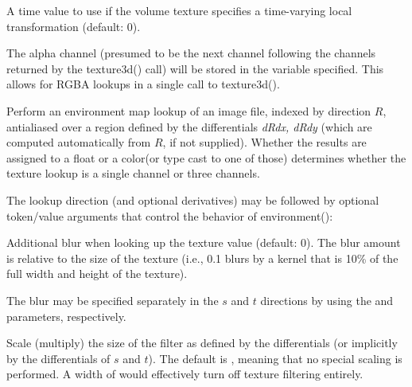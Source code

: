 \documentclass[11pt,letterpaper]{book}
\def\color{{\cf color}\xspace}
\def\float{{\cf float}\xspace}
\begin{document}
\vspace{12pt}
A time value to use if the volume texture specifies a time-varying
local transformation (default: 0).
\apiend
\vspace{-16pt}

\vspace{12pt}
The alpha channel (presumed to be the next channel following the
channels returned by the {\cf texture3d()} call) will be stored in the
variable specified.  This allows for RGBA lookups in a single call to
{\cf texture3d()}.
\apiend
\vspace{-16pt}

\apiend


Perform an environment map lookup of an image file, indexed by direction
$R$, antialiased over a region defined by the differentials
\emph{dRdx, dRdy} (which are computed
automatically from $R$, if not supplied).  Whether the results
are assigned to a \float or a \color (or type cast to one of those)
determines whether the texture lookup is a single channel or three
channels.

The lookup direction (and optional derivatives) may be followed by optional token/value
arguments that control the behavior of {\cf environment()}:

\vspace{12pt}
Additional blur when looking up the texture value (default: 0).  The
blur amount is relative to the size of the texture (i.e., 0.1 blurs by a
kernel that is 10\% of the full width and height of the texture).

The blur may be specified separately in the $s$ and $t$ directions by
using the  and  parameters, respectively.
\apiend
\vspace{-16pt}

\vspace{12pt}
Scale (multiply) the size of the filter as defined by the differentials
(or implicitly by the differentials of $s$ and $t$).  The default is
{}, meaning that no special scaling is performed.  A width of
{} would effectively turn off texture filtering entirely.
\end{document}
